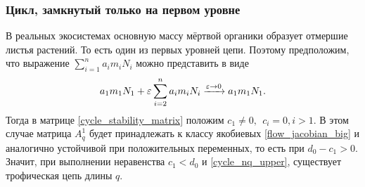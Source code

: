 \subsubsection{Цикл, замкнутый только на первом уровне}
В реальных экосистемах основную массу мёртвой органики образует отмершие листья растений. То есть один из первых уровней цепи. Поэтому предположим, что выражение \( \sum_{i=1}^{n} a_i m_i N_i \) можно представить в виде 
\begin{equation*}
    a_1 m_1 N_1 + \varepsilon \sum_{i=2}^{n} a_i m_i N_i \xrightarrow{\varepsilon \to 0} a_1 m_1 N_1.
\end{equation*}
Тогда в матрице \eqref{cycle_stability_matrix} положим \(c_1 \neq 0, ~~ c_i = 0, i>1\). В этом случае матрица \(A^1_q\) будет принадлежать к классу якобиевых \eqref{flow_jacobian_big} и аналогично устойчивой при положительных переменных, то есть при \(d_0 - c_1 > 0\). Значит, при выполнении неравенства \(c_1 < d_0\) и \eqref{cycle_nq_upper}, существует трофическая цепь длины \(q\).

